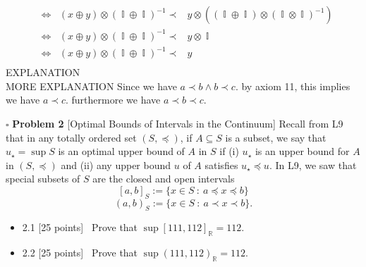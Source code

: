 \documentclass[11pt]{article}
\numberwithin{equation}{section}
\DeclareMathOperator*{\II}{\mathbb{I}}
\DeclareMathOperator*{\+}{\oplus}
\DeclareMathOperator*{\x}{\otimes}
\DeclareMathOperator*{\fl}{\prec} %
\DeclareMathOperator*{\Lra}{\Leftrightarrow}
\begin{document}
\begin{enumerate}[label= 1.\arabic*, itemsep=0.2cm]
\begin{align*}
  &\Lra& (x \+ y) \x (\II \+ \II)^{-1} \fl& y \x ((\II \+ \II) \x (\II \x \II)^{-1}) \\ %
  &\Lra& (x \+ y) \x (\II \+ \II)^{-1} \fl& y \x \II \\ %
  &\Lra& (x \+ y) \x (\II \+ \II)^{-1} \fl& y  \\ %
\end{align*}
     EXPLANATION\\ 
MORE EXPLANATION Since we have $a\fl b \land b \fl c$. by axiom 11, this implies we have $a \fl c$. furthermore we have $a\fl b\fl c$.



   \end{enumerate}


\newpage
    \noindent $\square$ \textbf{Problem 2}  [\textsf{Optimal Bounds of Intervals in the Continuum}] Recall from \textsf{L9} that in any totally ordered set $(S, \preceq)$, if $A \subseteq S$ is a subset, we say that $u_{\star} = \sup S$ is an optimal upper bound of $A$ in $S$ if (i) $u_{\star}$ is an upper bound for $A$ in $(S, \preceq)$ and (ii) any upper bound $u$ of $A$ satisfies $u_{\star} \preceq u$.  In \textsf{L9}, we saw that special subsets of $S$ are the closed and open intervals $$[a,b]_S := \Big \{ x \in S \ : \ a \preceq x \preceq b \Big \}$$
    $$(a,b)_S := \Big \{ x \in S \ : \ a \prec x \prec b \Big \}.$$
    
              \begin{itemize} 
   \itemsep0em 
 \item 2.1 [25 points] \ Prove that $\sup [111,112]_{\mathbb{R}} = 112$.
   
 \item 2.2 [25 points] \ Prove that $\sup (111,112)_{\mathbb{R}} = 112$.
\end{itemize}
\end{document}
